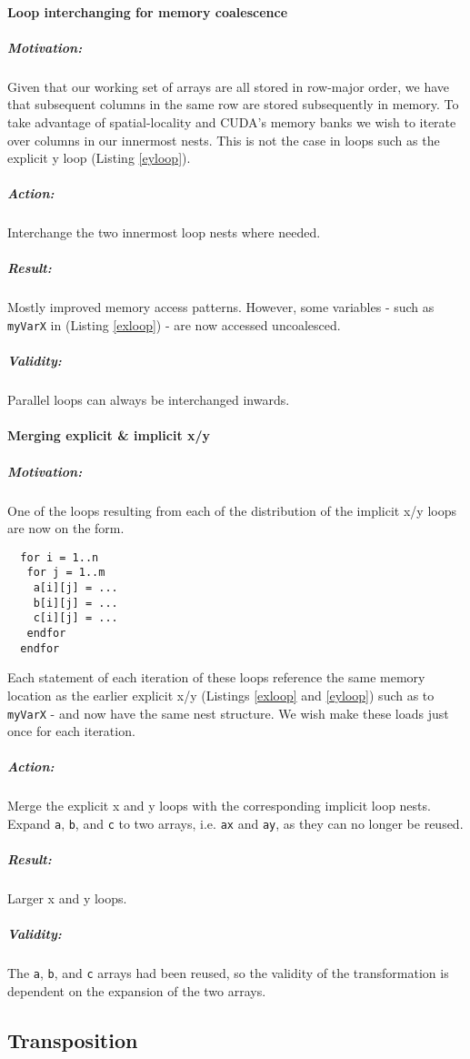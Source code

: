 \paragraph{Loop interchanging for memory coalescence}
\subparagraph{Motivation:} Given that our working set of arrays are all stored in row-major order, we have that subsequent columns in the
 same row are stored subsequently in memory. To take advantage of spatial-locality and CUDA's memory banks we wish to iterate over columns
 in our innermost nests. This is not the case in loops such as the explicit y loop (Listing \ref{eyloop}).
\subparagraph{Action:} Interchange the two innermost loop nests where needed.
\subparagraph{Result:} Mostly improved memory access patterns. However, some variables - such as \verb!myVarX! in (Listing \ref{exloop}) -
 are now accessed uncoalesced.
\subparagraph{Validity:} Parallel loops can always be interchanged inwards.
\paragraph{Merging explicit \& implicit x/y}
\subparagraph{Motivation:} One of the loops resulting from each of the distribution of the implicit x/y loops are now on the form.
\begin{lstlisting}
  for i = 1..n
   for j = 1..m
    a[i][j] = ...
    b[i][j] = ...
    c[i][j] = ...
   endfor
  endfor
\end{lstlisting}
 Each statement of each iteration of these loops reference the same memory location as the earlier explicit x/y
 (Listings \ref{exloop} and \ref{eyloop}) such as to \verb!myVarX! - and now have the same nest structure. We wish make these loads just
 once for each iteration.
\subparagraph{Action:} Merge the explicit x and y loops with the corresponding implicit loop nests. Expand \verb!a!, \verb!b!, and \verb!c!
 to two arrays, i.e. \verb!ax! and \verb!ay!, as they can no longer be reused.
\subparagraph{Result:} Larger x and y loops.
\subparagraph{Validity:} The \verb!a!, \verb!b!, and \verb!c! arrays had been reused, so the validity of the transformation is dependent on
 the expansion of the two arrays.
\subsection{Transposition}

